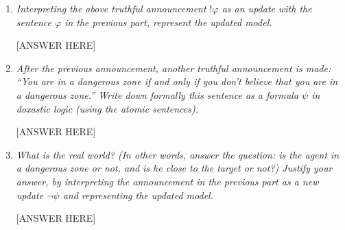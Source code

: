 \documentclass[leqno]{article}
\begin{document}
\begin{enumerate}

    \item \textit{Interpreting the above truthful announcement $!\varphi$ as an
    update with the sentence $\varphi$ in the previous part, represent the
    updated model.}

    [ANSWER HERE]

    \item \textit{After the previous announcement, another truthful
    announcement is made: “You are in a dangerous zone if and only if you don’t
    believe that you are in a dangerous zone.” Write down formally this
    sentence as a formula $\psi$ in doxastic logic (using the atomic
    sentences).}

    [ANSWER HERE]

    \item \textit{What is the real world? (In other words, answer the question:
    is the agent in a dangerous zone or not, and is he close to the target or
    not?) Justify your answer, by interpreting the announcement in the previous
    part as a new update $\neg \psi$ and representing the updated model.}

    [ANSWER HERE]

\end{enumerate}
\end{document}
